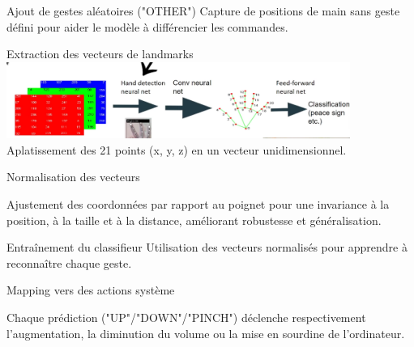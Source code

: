 \documentclass{beamer}
\begin{document}
\begin{frame}{Ajout de gestes aléatoires ("OTHER")} 
Capture de positions de main sans geste défini pour aider le modèle à différencier les commandes.
\end{frame}

\begin{frame}{Extraction des vecteurs de landmarks}
    \includegraphics[height=2.5cm]{classification.png}
Aplatissement des 21 points (x, y, z) en un vecteur unidimensionnel.
\end{frame}

\begin{frame}{Normalisation des vecteurs}

Ajustement des coordonnées par rapport au poignet pour une invariance à la position, à la taille et à la distance, améliorant robustesse et généralisation.
\end{frame}

\begin{frame}{Entraînement du classifieur}
Utilisation des vecteurs normalisés pour apprendre à reconnaître chaque geste.
\end{frame}

\begin{frame}{Mapping vers des actions système}

Chaque prédiction ("UP"/"DOWN"/"PINCH") déclenche respectivement l'augmentation, la diminution du volume ou la mise en sourdine de l'ordinateur.
\end{frame}
\end{document}
